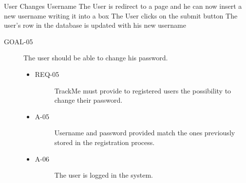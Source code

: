 \documentclass[a4paper]{article}
\newcommand{\requirement}{\ding{229}}%
\begin{document}
        
        
       \begin{usecase}{User Changes Username}
              {The User is redirect to a page and he can now insert a new username writing it into a box}
              {The User clicks on the submit button}
              {The user's row in the database is updated with his new username}
       \end{usecase}
       
               \begin{description}
        	\item[GOAL-05] The user should be able to change his password.
            	\begin{itemize}
            	    \item[\requirement]
                	\begin{description}
                	\item[REQ-05] TrackMe must provide to registered users the possibility to change their password. 
                	\end{description}
                	\item
                	\begin{description}
                	\item[A-05] Username and password provided match the ones previously stored in the registration process.
                	\end{description}
                	\item
                	\begin{description}
                	\item[A-06] The user is logged in the system.
                	\end{description}
                	\end{itemize}
        \end{description}
       
       
       
\end{document}
